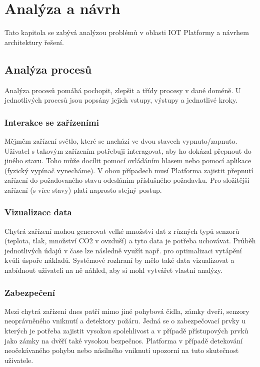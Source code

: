 
\chapter{Analýza a návrh}
Tato kapitola se zabývá analýzou problémů v oblasti IOT Platformy a návrhem architektury řešení.

\section{Analýza procesů}
Analýza procesů pomáhá pochopit, zlepšit a třídy procesy v dané doméně. U jednotlivých procesů jsou popsány jejich vstupy, výstupy a jednotlivé kroky.

\subsection{Interakce se zařízeními}
Mějměm zařízení světlo, které se nachází ve dvou stavech vypnuto/zapnuto. Uživatel s takovým zařízením potřebuji interagovat, aby ho dokázal přepnout do jiného stavu. Toho může docílit pomocí ovládáním hlasem nebo pomocí aplikace (fyzický vypínač vynecháme). V obou případech musí Platforma zajistit přepnutí zařízení do požadovaného stavu odesláním příslušného požadavku. Pro složitější zařízení (s více stavy) platí naprosto stejný postup.

\subsection{Vizualizace data}
Chytrá zařízení mohou generovat velké množství dat z různých typů senzorů (teplota, tlak, množství CO2 v ovzduší) a tyto data je potřeba uchovávat. Průběh jednotlivých údajů v čase lze následně využít např. pro optimalizaci vytápění kvůli úspoře nákladů. Systémové rozhraní by mělo také data vizualizovat a nabídnout uživateli na ně náhled, aby si mohl vytvářet vlastní analýzy.

\subsection{Zabezpečení}
Mezi chytrá zařízení dnes patří mimo jiné pohybová čidla, zámky dveří, senzory neoprávněného vniknutí a detektory požáru. Jedná se o zabezpečovací prvky u kterých je potřeba zajistit vysokou spolehlivost a v případě přístupových prvků jako zámky na dvěří také vysokou bezpečnos. Platforma v případě detekování neočekávaného pohybu nebo násilného vniknutí upozorní na tuto skutečnost uživatele.


